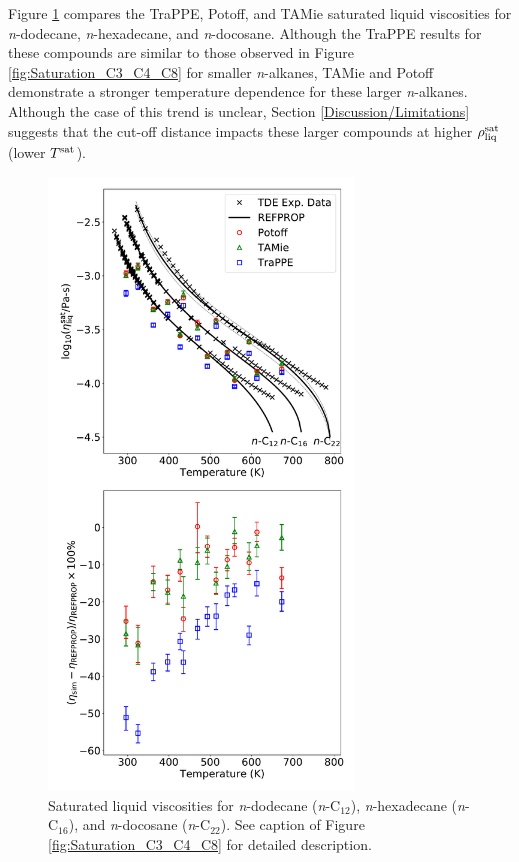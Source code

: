\documentclass[preprint,review,12pt]{elsarticle}
\begin{document}
	Figure \ref{fig:Saturation_C12_C16_C22} compares the TraPPE, Potoff, and TAMie saturated liquid viscosities for \textit{n}-dodecane, \textit{n}-hexadecane, and \textit{n}-docosane. Although the TraPPE results for these compounds are similar to those observed in Figure \ref{fig:Saturation_C3_C4_C8} for smaller \textit{n}-alkanes, TAMie and Potoff demonstrate a stronger temperature dependence for these larger \textit{n}-alkanes. Although the case of this trend is unclear, Section \ref{Discussion/Limitations} suggests that the cut-off distance impacts these larger compounds at higher $\rho_{\rm liq}^{\rm sat}$ (lower $T^{\rm sat}$).
	
	
	\begin{figure}[htb!]
		\centering
		\includegraphics[width=3.2in]{compare_force_fields_long_normal.pdf}
		\caption{Saturated liquid viscosities for \textit{n}-dodecane (\textit{n}-C$_{12}$), \textit{n}-hexadecane (\textit{n}-C$_{16}$), and \textit{n}-docosane (\textit{n}-C$_{22}$). See caption of Figure \ref{fig:Saturation_C3_C4_C8} for detailed description.}
		\label{fig:Saturation_C12_C16_C22}
	\end{figure} 
	
\end{document}
